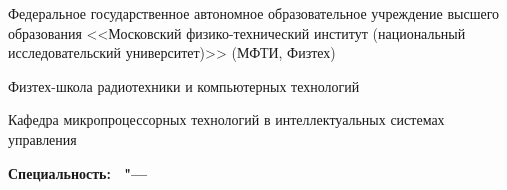 \thispagestyle{empty}

\begin{center}
Федеральное государственное автономное образовательное учреждение высшего образования <<Московский физико-технический институт (национальный исследовательский университет)>> (МФТИ, Физтех) \par

\vspace{0pt plus0.5fill}
Физтех-школа радиотехники и компьютерных технологий \par

\vspace{0pt plus0.5fill}
Кафедра микропроцессорных технологий в интеллектуальных системах управления \par

\end{center}
\vspace{0pt plus2fill}

\noindent%
{\textbf{Специальность: \thesisSpecialtyNumber\ "---} \textbf{\thesisSpecialtyTitle}}

